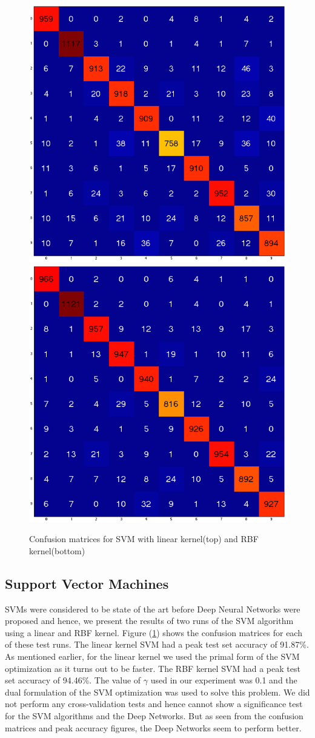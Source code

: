 \documentclass[10pt,twocolumn,letterpaper]{article}
\begin{document}
\begin{figure}[t]
\begin{center}
   	\includegraphics[width=0.65\linewidth]{../images/confusion_svm.png}
	\includegraphics[width=0.65\linewidth]{../images/confusion_svm_rbf.png}
\end{center}
   \caption{Confusion matrices for SVM with linear kernel(top) and RBF kernel(bottom)}
   \label{fig:confusionsvm}
\end{figure}

\subsection{Support Vector Machines}
SVMs were considered to be state of the art before Deep Neural Networks were proposed and hence, we present the results of two runs of the SVM algorithm using a linear and RBF kernel. Figure (\ref{fig:confusionsvm}) shows the confusion matrices for each of these test runs. The linear kernel SVM had a peak test set accuracy of 91.87\%. As mentioned earlier, for the linear kernel we used the primal form of the SVM optimization as it turns out to be faster. The RBF kernel SVM had a peak test set accuracy of 94.46\%. The value of $\gamma$ used in our experiment was 0.1 and the dual formulation of the SVM optimization was used to solve this problem. We did not perform any cross-validation tests and hence cannot show a significance test for the SVM algorithms and the Deep Networks. But as seen from the confusion matrices and peak accuracy figures, the Deep Networks seem to perform better.\\
\end{document}
